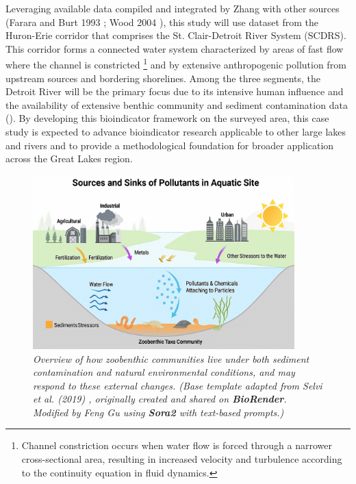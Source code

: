 Leveraging available data compiled and integrated by Zhang \cite{Zhang2008} with other sources
(Farara and Burt 1993 \cite{Farara1993}; Wood 2004 \cite{Wood2004}), this study
will use dataset from the Huron-Erie corridor that comprises the St. Clair-Detroit River System (SCDRS).
This corridor forms a connected water system
characterized by areas of fast flow where the channel is constricted
\footnote{
Channel constriction occurs when water flow is forced through a narrower cross-sectional area,
resulting in increased velocity and turbulence according to the continuity 
equation in fluid dynamics.} and by extensive anthropogenic pollution from
upstream sources and bordering shorelines.
Among the three segments, the Detroit River will be the primary focus due to its intensive human influence
and the availability of extensive benthic community and sediment contamination data (\cite{Zhang2008}).
By developing this bioindicator framework on the surveyed area, this case study is expected 
to advance bioindicator research applicable to other large lakes and rivers and to 
provide a methodological foundation for broader application across the Great Lakes region.

\begin{figure}[!h]
    \centering
    \includegraphics[width=0.9\textwidth]{../results/ideas_visualization/introduction_study_system.png}
    \caption{\textit{Overview of how zoobenthic communities live under both sediment contamination and natural environmental conditions, 
    and may respond to these external changes. 
    (Base template adapted from Selvi \textit{et al.} (2019) \cite{Selvi2019}, originally created and shared on \textbf{BioRender}. 
    Modified by Feng Gu using \textbf{Sora2} with text-based prompts.)}}
    \label{fig:introduction_study_system}

\end{figure}
